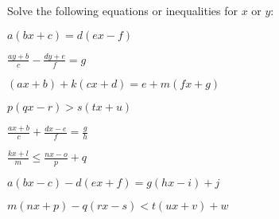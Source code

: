 \documentclass[10pt]{exam}
\begin{document}
Solve the following equations or inequalities for \(x\) or \(y\):

\begin{questions}
\begin{multicols}{2}

\question
\(\displaystyle a(bx + c) = d(ex - f) \)

\vspace*{1.6in}

\question
\(\displaystyle \frac{ay + b}{c} - \frac{dy + e}{f} = g \)

\vspace*{1.8in}

\question
\(\displaystyle (ax + b) + k(cx + d) = e + m(fx + g) \)

\vspace*{1.9in}

\question
\(\displaystyle p(qx - r) > s(tx + u) \)

\vspace*{1.7in}

\question
\(\displaystyle \frac{ax + b}{c} + \frac{dx - e}{f} = \frac{g}{h} \)

\vspace*{1.6in}

\question
\(\displaystyle \frac{kx + l}{m} \leq \frac{nx - o}{p} + q \)

\vspace*{1.8in}

\question
\(\displaystyle a(bx - c) - d(ex + f) = g(hx - i) + j \)

\vspace*{1.9in}

\question
\(\displaystyle m(nx + p) - q(rx - s) < t(ux + v) + w \)

\vspace*{1.7in}

\end{multicols}
\end{questions}

\newpage
\end{document}

